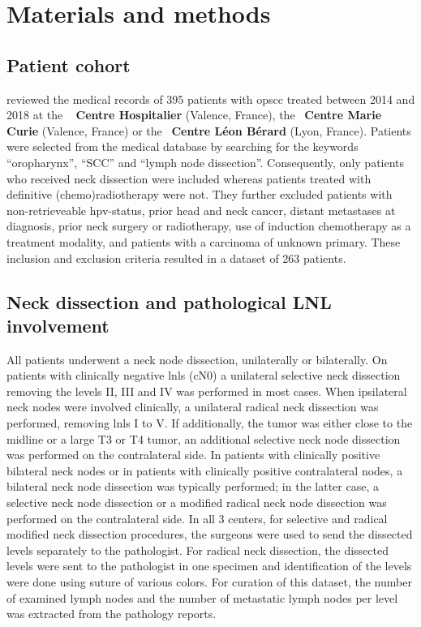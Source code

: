 \documentclass[\relativeRoot/main.tex]{subfiles}
\begin{document}
\section{Materials and methods}
\label{sec:dataset_clb:methods}

\subsection{Patient cohort}
\label{subsec:dataset_clb:methods:cohort}

 reviewed the medical records of 395 patients with \gls{opscc} treated between 2014 and 2018 at the ~\textbf{
Centre Hospitalier} (Valence, France), the ~\textbf{Centre Marie Curie} (Valence, France) or the ~\textbf{Centre Léon Bérard} (Lyon, France). Patients were selected from the medical database by searching for the keywords ``oropharynx'', ``SCC'' and ``lymph node dissection''. Consequently, only patients who received neck dissection were included whereas patients treated with definitive (chemo)radiotherapy were not. They further excluded patients with non-retrieveable \gls{hpv}-status, prior head and neck cancer, distant metastases at diagnosis, prior neck surgery or radiotherapy, use of induction chemotherapy as a treatment modality, and patients with a carcinoma of unknown primary. These inclusion and exclusion criteria resulted in a dataset of 263 patients.

\subsection{Neck dissection and pathological LNL involvement}
\label{subsec:dataset_clb:methods:dissection}

All patients underwent a neck node dissection, unilaterally or bilaterally. On patients with clinically negative \glspl{lnl} (cN0) a unilateral selective neck dissection removing the levels II, III and IV was performed in most cases. When ipsilateral neck nodes were involved clinically, a unilateral radical neck dissection was performed, removing \glspl{lnl} I to V. If additionally, the tumor was either close to the midline or a large T3 or T4 tumor, an additional selective neck node dissection was performed on the contralateral side. In patients with clinically positive bilateral neck nodes or in patients with clinically positive contralateral nodes, a bilateral neck node dissection was typically performed; in the latter case, a selective neck node dissection or a modified radical neck node dissection was performed on the contralateral side. In all 3 centers, for selective and radical modified neck dissection procedures, the surgeons were used to send the dissected levels separately to the pathologist. For radical neck dissection, the dissected levels were sent to the pathologist in one specimen and identification of the levels were done using suture of various colors. For curation of this dataset, the number of examined lymph nodes and the number of metastatic lymph nodes per level was extracted from the pathology reports.
\end{document}
